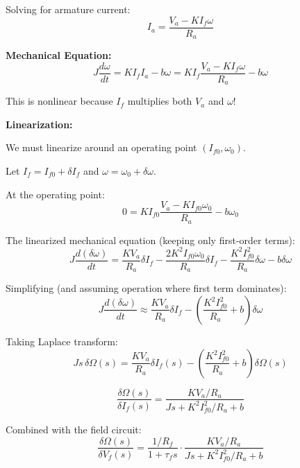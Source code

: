 Solving for armature current:
\begin{equation}
    I_a = \frac{V_a - K I_f \omega}{R_a}
\end{equation}

\textbf{Mechanical Equation:}
\begin{equation}
    J \frac{d\omega}{dt} = K I_f I_a - b \omega = K I_f \frac{V_a - K I_f \omega}{R_a} - b \omega
\end{equation}

This is nonlinear because $I_f$ multiplies both $V_a$ and $\omega$!

\textbf{Linearization:}

We must linearize around an operating point $(I_{f0}, \omega_0)$.

Let $I_f = I_{f0} + \delta I_f$ and $\omega = \omega_0 + \delta \omega$.

At the operating point:
\begin{equation}
    0 = K I_{f0} \frac{V_a - K I_{f0} \omega_0}{R_a} - b \omega_0
\end{equation}

The linearized mechanical equation (keeping only first-order terms):
\begin{equation}
    J \frac{d(\delta\omega)}{dt} = \frac{K V_a}{R_a} \delta I_f - \frac{2 K^2 I_{f0} \omega_0}{R_a} \delta I_f - \frac{K^2 I_{f0}^2}{R_a} \delta\omega - b \delta\omega
\end{equation}

Simplifying (and assuming operation where first term dominates):
\begin{equation}
    J \frac{d(\delta\omega)}{dt} \approx \frac{K V_a}{R_a} \delta I_f - \left(\frac{K^2 I_{f0}^2}{R_a} + b\right) \delta\omega
\end{equation}

Taking Laplace transform:
\begin{equation}
    J s \, \delta\Omega(s) = \frac{K V_a}{R_a} \delta I_f(s) - \left(\frac{K^2 I_{f0}^2}{R_a} + b\right) \delta\Omega(s)
\end{equation}

\begin{equation}
    \frac{\delta\Omega(s)}{\delta I_f(s)} = \frac{K V_a / R_a}{J s + K^2 I_{f0}^2 / R_a + b}
\end{equation}

Combined with the field circuit:
\begin{equation}
    \frac{\delta\Omega(s)}{\delta V_f(s)} = \frac{1/R_f}{1 + \tau_f s} \cdot \frac{K V_a / R_a}{J s + K^2 I_{f0}^2 / R_a + b}
\end{equation}

